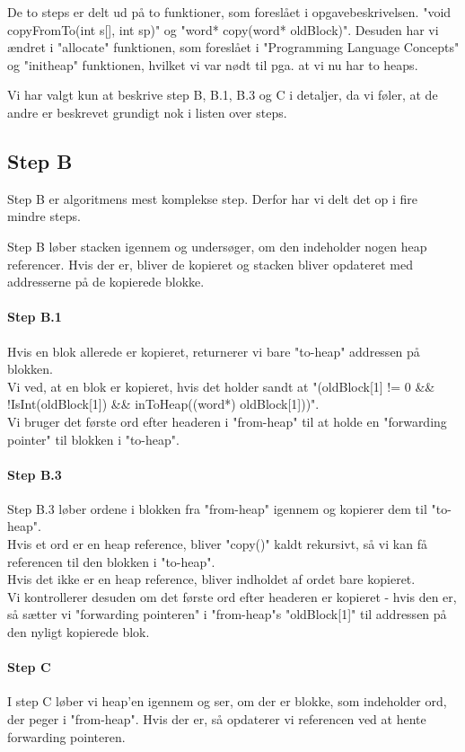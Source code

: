 De to steps er delt ud på to funktioner, som foreslået i opgavebeskrivelsen. "void copyFromTo(int s[], int sp)" og "word* copy(word* oldBlock)". Desuden har vi ændret i "allocate" funktionen, som foreslået i "Programming Language Concepts" og "initheap" funktionen, hvilket vi var nødt til pga. at vi nu har to heaps.

Vi har valgt kun at beskrive step B, B.1, B.3 og C i detaljer, da vi føler, at de andre er beskrevet grundigt nok i listen over steps.
\subsection{Step B}
Step B er algoritmens mest komplekse step. Derfor har vi delt det op i fire mindre steps.

Step B løber stacken igennem og undersøger, om den indeholder nogen heap referencer. Hvis der er, bliver de kopieret og stacken bliver opdateret med addresserne på de kopierede blokke.
\paragraph{Step B.1}
Hvis en blok allerede er kopieret, returnerer vi bare "to-heap" addressen på blokken. 
\\Vi ved, at en blok er kopieret, hvis det holder sandt at "(oldBlock[1] != 0 \&\& !IsInt(oldBlock[1]) \&\& inToHeap((word*) oldBlock[1]))". 
\\Vi bruger det første ord efter headeren i "from-heap" til at holde en "forwarding pointer" til blokken i "to-heap".
\paragraph{Step B.3}
Step B.3 løber ordene i blokken fra "from-heap" igennem og kopierer dem til "to-heap". 
\\Hvis et ord er en heap reference, bliver "copy()" kaldt rekursivt, så vi kan få referencen til den blokken i "to-heap".
\\Hvis det ikke er en heap reference, bliver indholdet af ordet bare kopieret.
\\ Vi kontrollerer desuden om det første ord efter headeren er kopieret - hvis den er, så sætter vi "forwarding pointeren" i "from-heap"s "oldBlock[1]" til addressen på den nyligt kopierede blok.
\paragraph{Step C}
I step C løber vi heap'en igennem og ser, om der er blokke, som indeholder ord, der peger i "from-heap". Hvis der er, så opdaterer vi referencen ved at hente forwarding pointeren.
